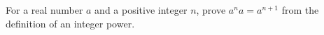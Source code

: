 For a real number $a$ and a positive integer $n$, prove $a^n a=a^{n+1}$ from the definition of an integer power.
